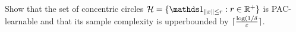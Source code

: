 \begin{problem}{3}
    Show that the set of concentric circles $\cH = \{\ind_{\norm{x} \leq r}: r\in \R^+\}$ is PAC-learnable and that its sample complexity is upperbounded by $\lceil\frac{\log(1/\delta}{\varepsilon}\rceil$.
\end{problem}
\begin{solution}
    
\end{solution}

\begin{problem}{4}

\end{problem}
\begin{solution}
    
\end{solution}

\begin{problem}{5}

\end{problem}
\begin{solution}
    
\end{solution}

\begin{problem}{6}

\end{problem}
\begin{solution}
    
\end{solution}

\begin{problem}{7}

\end{problem}
\begin{solution}
    
\end{solution}

\begin{problem}{8}

\end{problem}
\begin{solution}
    
\end{solution}

\begin{problem}{9}

\end{problem}
\begin{solution}
    
\end{solution}